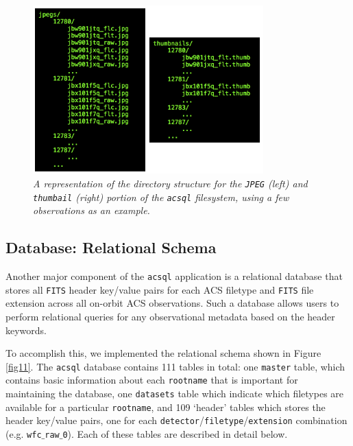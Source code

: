 \documentclass[10pt,journal,compsoc]{IEEEtran}
\begin{document}
\begin{figure}[!h]
\centering
\includegraphics[width=3.5in]{./figures/jpeg_filesystem.png}
\caption{\textit{A representation of the directory structure for the \texttt{JPEG} (left) and \texttt{thumbail} (right) portion of the \texttt{acsql} filesystem, using a few observations
as an example.}}
\label{fig10}
\end{figure}


\subsection{Database: Relational Schema} \label{sec3.5}

Another major component of the \texttt{acsql} application is a relational database that stores all \texttt{FITS} header key/value pairs for each ACS filetype and \texttt{FITS} file
extension across all on-orbit ACS observations.  Such a database allows users to perform relational queries for any observational metadata based on the header keywords.

To accomplish this, we implemented the relational schema shown in Figure \ref{fig11}.  The \texttt{acsql} database contains 111 tables in total: one \texttt{master} table, which contains
basic information about each \texttt{rootname} that is important for maintaining the database, one \texttt{datasets} table which indicate which filetypes are available for a
particular \texttt{rootname}, and 109 `header' tables which stores the header key/value pairs, one for each \texttt{detector}/\texttt{filetype}/\texttt{extension} combination (e.g.
\texttt{wfc$\_$raw$\_$0}).  Each of these tables are described in detail below.
\end{document}

